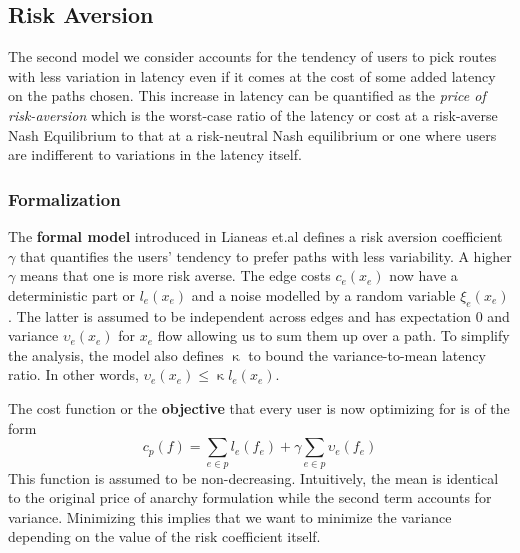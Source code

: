 \subsection{Risk Aversion}
The second model we consider accounts for the
tendency of users to pick routes with less variation in latency even if it comes at the cost of some added
latency on the paths chosen. This increase in latency can be quantified as the {\em{price of risk-aversion}}
which is the worst-case ratio of the latency or cost at a risk-averse Nash Equilibrium to that at a risk-neutral
Nash equilibrium or one where users are indifferent to variations in the latency itself.


\subsubsection{Formalization} The {\textbf{formal model}} introduced in Lianeas et.al \cite{risk-averse} defines 
a risk aversion coefficient $\gamma$ that quantifies the users' tendency to prefer paths with less variability. 
A higher $\gamma$ means that one is more risk averse. The edge costs $c_e(x_e)$ now have a deterministic part 
or $l_e(x_e)$ and a noise modelled by a random variable $\xi_e(x_e)$. The latter is assumed to be independent across edges 
and has expectation $0$ and variance $\upsilon_e(x_e)$ for $x_e$ flow allowing us to sum them up over a path. To simplify 
the analysis, the model also defines $\upkappa$ to bound the variance-to-mean latency ratio. In other words, 
$\upsilon_e(x_e) \leq \upkappa l_e(x_e)$.

The cost function or the {\textbf{objective}} that every user is now optimizing for is of the form
$$c_p(f) = \sum_{e \in p}l_e(f_e) + \gamma \sum_{e \in p}\upsilon_e(f_e)$$
This function is assumed to be non-decreasing. Intuitively, the mean is identical to the original price of anarchy formulation
while the second term accounts for variance. Minimizing this implies that we want to minimize the variance depending on the
value of the risk coefficient itself.

